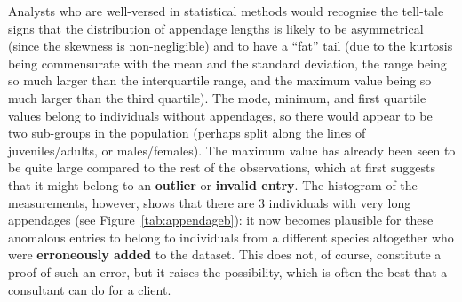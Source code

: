 Analysts who are well-versed in statistical methods would recognise the tell-tale signs that the distribution of appendage lengths is likely to be asymmetrical (since the skewness is non-negligible) and to have a ``fat'' tail (due to the kurtosis being commensurate with the mean and the standard deviation, the range being so much larger than the interquartile range, and the maximum value being so much larger than the third quartile). The mode, minimum, and first quartile values belong to individuals without appendages, so there would appear to be two sub-groups in the population (perhaps split along the lines of juveniles/adults, or males/females). The maximum value has already been seen to be quite large compared to the rest of the observations, which at first suggests that it might belong to an \textbf{outlier} or \textbf{invalid entry}. The histogram of the measurements, however, shows that there are 3 individuals with very long appendages (see Figure~\ref{tab:appendageb}): it now becomes plausible for these anomalous entries to belong to individuals from a different species altogether who were \textbf{erroneously added} to the dataset. This does not, of course, constitute a proof of such an error, but it raises the possibility, which is often the best that a consultant can do for a client.   
